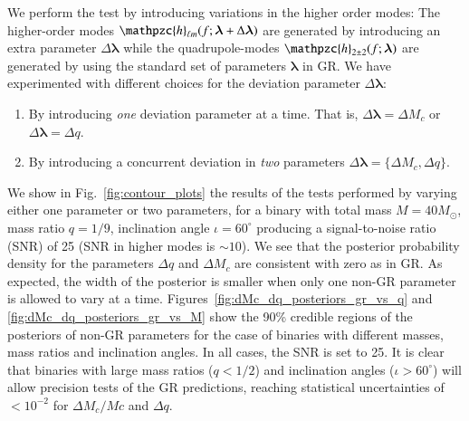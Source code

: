 \documentclass[prl,preprintnumbers,twocolumn,eqsecnum,floatfix,a4paper,nofootinbib,superscriptaddress]{revtex4}
\newcommand{\h}{\mathpzc{h}}
\newcommand{\hlm}{\mathpzc{h}_{\ell m}}
\newcommand{\blambda}{\bm{\lambda}}
\begin{document}
We perform the test by introducing variations in the higher order modes: The higher-order modes $\hlm(f; \blambda+\Delta\blambda)$ are generated by introducing an extra parameter $\Delta\blambda$ while the quadrupole-modes $\h_{2\pm2}(f; \blambda)$ are generated by using the standard set of parameters $\blambda$ in GR. We have experimented with different choices for the deviation parameter $\Delta\blambda$: 
\begin{enumerate}
\item By introducing \emph{one} deviation parameter at a time. That is, $\Delta\blambda = {\Delta M_c}$ or $\Delta\blambda = {\Delta q}$. 
\item By introducing a concurrent deviation in \emph{two} parameters $\Delta \blambda = \{\Delta M_c, \Delta q\}$. 
\end{enumerate}
We show in Fig.~\ref{fig:contour_plots} the results of the tests performed by varying either one parameter or two parameters, for a binary with total mass $M = 40M_{\odot}$, mass ratio $q=1/9$, inclination angle $ {\iota}=60^{\circ} $ producing a signal-to-noise ratio  (SNR)  of 25 (SNR in higher modes is $\sim 10$). We see that the posterior probability density for the parameters $\Delta q$ and $\Delta M_c$ are consistent with zero as in GR. As expected, the width of the posterior is smaller when only one non-GR parameter is allowed to vary at a time. Figures~\ref{fig:dMc_dq_posteriors_gr_vs_q} and \ref{fig:dMc_dq_posteriors_gr_vs_M} show the 90\% credible regions of the posteriors of non-GR parameters for the case of binaries with different masses, mass ratios and inclination angles. In all cases, the SNR is set to {25}.  It is clear that binaries with large mass ratios ($q < 1/2$) and inclination angles ($\iota > 60 ^\circ $) will allow precision tests of the GR predictions, reaching statistical uncertainties of $< 10^{-2}$ for $\Delta M_c/Mc$ and $\Delta q$.   
\end{document}
